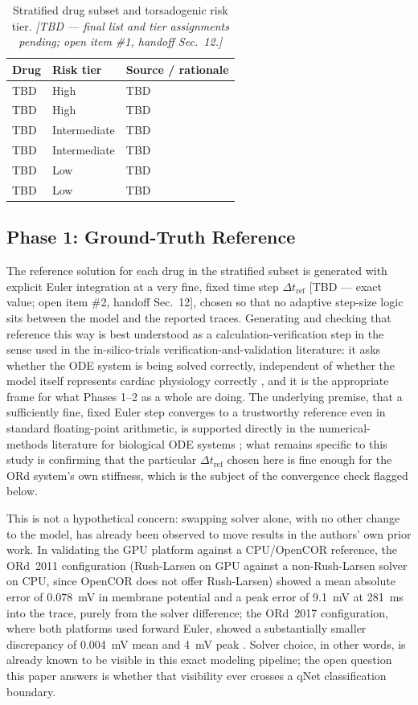 \documentclass[journal]{IEEEtran}
\begin{document}
\begin{table}[!t]
\centering
\caption{Stratified drug subset and torsadogenic risk tier. \emph{[TBD --- final list and tier assignments pending; open item \#1, handoff Sec.~12.]}}
\label{tab:drugs}
\begin{tabular}{@{}lll@{}}
\toprule
Drug & Risk tier & Source / rationale \\
\midrule
TBD & High & TBD \\
TBD & High & TBD \\
TBD & Intermediate & TBD \\
TBD & Intermediate & TBD \\
TBD & Low & TBD \\
TBD & Low & TBD \\
\bottomrule
\end{tabular}
\end{table}

\subsection{Phase 1: Ground-Truth Reference}

The reference solution for each drug in the stratified subset is generated with explicit Euler integration at a very fine, fixed time step $\Delta t_{\text{ref}}$ [TBD --- exact value; open item \#2, handoff Sec.~12], chosen so that no adaptive step-size logic sits between the model and the reported traces. Generating and checking that reference this way is best understood as a calculation-verification step in the sense used in the in-silico-trials verification-and-validation literature: it asks whether the ODE system is being solved correctly, independent of whether the model itself represents cardiac physiology correctly \cite{invitro2020}, and it is the appropriate frame for what Phases 1--2 as a whole are doing. The underlying premise, that a sufficiently fine, fixed Euler step converges to a trustworthy reference even in standard floating-point arithmetic, is supported directly in the numerical-methods literature for biological ODE systems \cite{eulerprecision2013}; what remains specific to this study is confirming that the particular $\Delta t_{\text{ref}}$ chosen here is fine enough for the ORd system's own stiffness, which is the subject of the convergence check flagged below.

This is not a hypothetical concern: swapping solver alone, with no other change to the model, has already been observed to move results in the authors' own prior work. In validating the GPU platform against a CPU/OpenCOR reference, the ORd~2011 configuration (Rush-Larsen on GPU against a non-Rush-Larsen solver on CPU, since OpenCOR does not offer Rush-Larsen) showed a mean absolute error of 0.078~mV in membrane potential and a peak error of 9.1~mV at 281~ms into the trace, purely from the solver difference; the ORd~2017 configuration, where both platforms used forward Euler, showed a substantially smaller discrepancy of 0.004~mV mean and 4~mV peak \cite{pramawijaya2024thesis}. Solver choice, in other words, is already known to be visible in this exact modeling pipeline; the open question this paper answers is whether that visibility ever crosses a qNet classification boundary.
\end{document}
